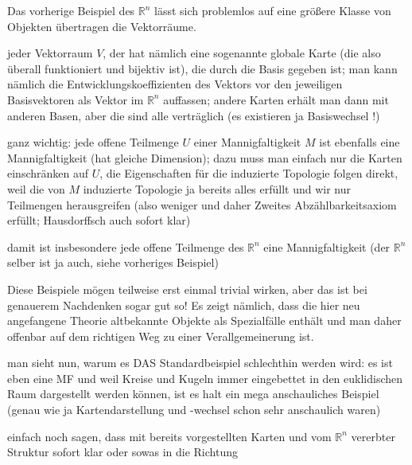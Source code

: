\documentclass[../H_Analysis_main.tex]{subfiles}
\begin{document}
\begin{bsp}
Das vorherige Beispiel des $\mathbb{R}^n$ lässt sich problemlos auf eine größere Klasse von Objekten übertragen die Vektorräume.


jeder Vektorraum $V$, der hat nämlich eine sogenannte globale Karte (die also überall funktioniert und bijektiv ist), die durch die Basis gegeben ist; man kann nämlich die Entwicklungskoeffizienten des Vektors vor den jeweiligen Basisvektoren als Vektor im $\mathbb{R}^n$ auffassen; andere Karten erhält man dann mit anderen Basen, aber die sind alle verträglich (es existieren ja Basiswechsel !)


ganz wichtig: jede offene Teilmenge $U$ einer Mannigfaltigkeit $M$ ist ebenfalls eine Mannigfaltigkeit (hat gleiche Dimension); dazu muss man einfach nur die Karten einschränken auf $U$, die Eigenschaften für die induzierte Topologie folgen direkt, weil die von $M$ induzierte Topologie ja bereits alles erfüllt und wir nur Teilmengen herausgreifen (also weniger und daher Zweites Abzählbarkeitsaxiom erfüllt; Hausdorffsch auch sofort klar)

damit ist insbesondere jede offene Teilmenge des $\mathbb{R}^n$ eine Mannigfaltigkeit (der $\mathbb{R}^n$ selber ist ja auch, siehe vorheriges Beispiel)
\end{bsp}

Diese Beispiele mögen teilweise erst einmal trivial wirken, aber das ist bei genauerem Nachdenken sogar gut so! Es zeigt nämlich, dass die hier neu angefangene Theorie altbekannte Objekte als Spezialfälle enthält und man daher offenbar auf dem richtigen Weg zu einer Verallgemeinerung ist.

\begin{bsp}[Sphäre]
man sieht nun, warum es DAS Standardbeispiel schlechthin werden wird: es ist eben eine MF und weil Kreise und Kugeln immer eingebettet in den euklidischen Raum dargestellt werden können, ist es halt ein mega anschauliches Beispiel (genau wie ja Kartendarstellung und -wechsel schon sehr anschaulich waren)

einfach noch sagen, dass mit bereits vorgestellten Karten und vom $\mathbb{R}^n$ vererbter Struktur sofort klar oder sowas in die Richtung
\end{bsp}
\end{document}
